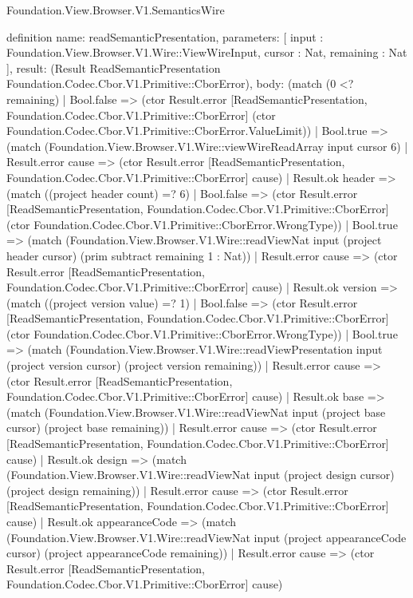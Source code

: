 \begin{lexlean}{Foundation.View.Browser.V1.SemanticsWire}
\begin{semanticmodule}
definition{
  name: readSemanticPresentation,
  parameters: [
    input : Foundation.View.Browser.V1.Wire::ViewWireInput,
    cursor : Nat,
    remaining : Nat
  ],
  result: (Result ReadSemanticPresentation Foundation.Codec.Cbor.V1.Primitive::CborError),
  body: (match (0 <? remaining)
    | Bool.false => (ctor Result.error [ReadSemanticPresentation, Foundation.Codec.Cbor.V1.Primitive::CborError] (ctor Foundation.Codec.Cbor.V1.Primitive::CborError.ValueLimit))
    | Bool.true => (match (Foundation.View.Browser.V1.Wire::viewWireReadArray input cursor 6)
      | Result.error cause => (ctor Result.error [ReadSemanticPresentation, Foundation.Codec.Cbor.V1.Primitive::CborError] cause)
      | Result.ok header => (match ((project header count) =? 6)
        | Bool.false => (ctor Result.error [ReadSemanticPresentation, Foundation.Codec.Cbor.V1.Primitive::CborError] (ctor Foundation.Codec.Cbor.V1.Primitive::CborError.WrongType))
        | Bool.true => (match (Foundation.View.Browser.V1.Wire::readViewNat input (project header cursor) (prim subtract remaining 1 : Nat))
          | Result.error cause => (ctor Result.error [ReadSemanticPresentation, Foundation.Codec.Cbor.V1.Primitive::CborError] cause)
          | Result.ok version => (match ((project version value) =? 1)
            | Bool.false => (ctor Result.error [ReadSemanticPresentation, Foundation.Codec.Cbor.V1.Primitive::CborError] (ctor Foundation.Codec.Cbor.V1.Primitive::CborError.WrongType))
            | Bool.true => (match (Foundation.View.Browser.V1.Wire::readViewPresentation input (project version cursor) (project version remaining))
              | Result.error cause => (ctor Result.error [ReadSemanticPresentation, Foundation.Codec.Cbor.V1.Primitive::CborError] cause)
              | Result.ok base => (match (Foundation.View.Browser.V1.Wire::readViewNat input (project base cursor) (project base remaining))
                | Result.error cause => (ctor Result.error [ReadSemanticPresentation, Foundation.Codec.Cbor.V1.Primitive::CborError] cause)
                | Result.ok design => (match (Foundation.View.Browser.V1.Wire::readViewNat input (project design cursor) (project design remaining))
                  | Result.error cause => (ctor Result.error [ReadSemanticPresentation, Foundation.Codec.Cbor.V1.Primitive::CborError] cause)
                  | Result.ok appearanceCode => (match (Foundation.View.Browser.V1.Wire::readViewNat input (project appearanceCode cursor) (project appearanceCode remaining))
                    | Result.error cause => (ctor Result.error [ReadSemanticPresentation, Foundation.Codec.Cbor.V1.Primitive::CborError] cause)
}
\end{semanticmodule}
\end{lexlean}
